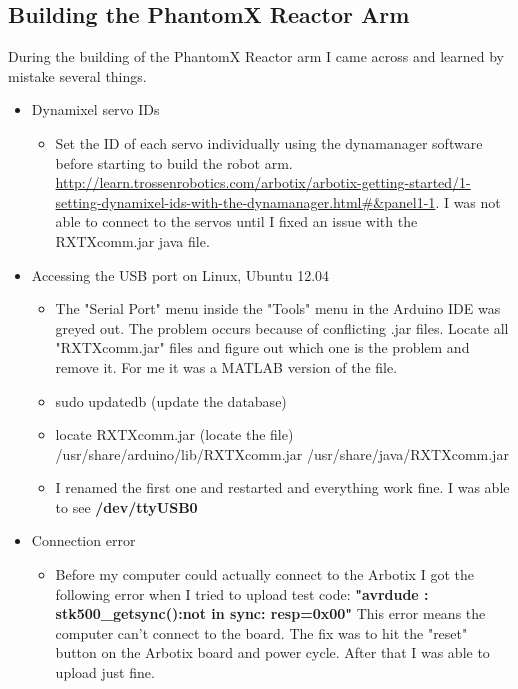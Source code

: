 \documentclass[letterpaper, 10 pt]{report}
\begin{document}
\subsection*{Building the PhantomX Reactor Arm}
During the building of the PhantomX Reactor arm I came across and learned by mistake several things.
\begin{itemize}
  \item Dynamixel servo IDs
    \begin{itemize}
    \item Set the ID of each servo individually using the dynamanager software before starting to build the robot arm. \url{http://learn.trossenrobotics.com/arbotix/arbotix-getting-started/1-setting-dynamixel-ids-with-the-dynamanager.html#&panel1-1}. I was not able to connect to the servos until I fixed an issue with the RXTXcomm.jar java file.
    \end{itemize}
  \item Accessing the USB port on Linux, Ubuntu 12.04
    \begin{itemize}
      \item The "Serial Port" menu inside the "Tools" menu in the Arduino IDE was greyed out. The problem occurs because of conflicting .jar files. Locate all "RXTXcomm.jar" files and figure out which one is the problem and remove it. For me it was a MATLAB version of the file.
      \item sudo updatedb (update the database)
      \item locate RXTXcomm.jar (locate the file) \newline
      /usr/share/arduino/lib/RXTXcomm.jar \newline
      /usr/share/java/RXTXcomm.jar
      \item I renamed the first one and restarted and everything work fine. I was able to see \textbf{/dev/ttyUSB0}
    \end{itemize}
  \item Connection error
    \begin{itemize}
      \item Before my computer could actually connect to the Arbotix I got the following error when I tried to upload test code: \textbf{"avrdude : stk500\_getsync():not in sync: resp=0x00"} \newline
      This error means the computer can't connect to the board. The fix was to hit the "reset" button on the Arbotix board and power cycle. After that I was able to upload just fine.
    \end{itemize}

\end{itemize}
\end{document}
